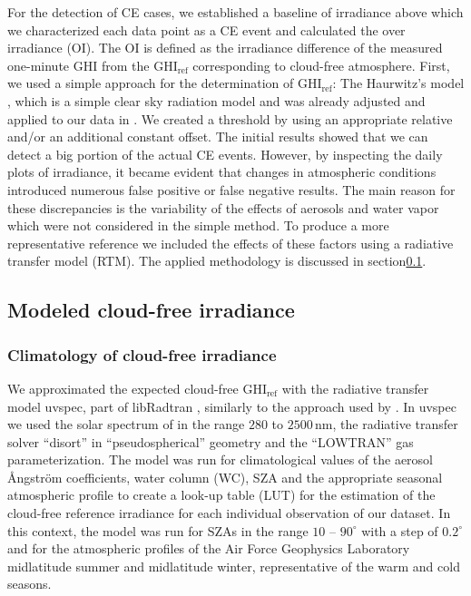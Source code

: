 \documentclass[preprint, 5p,
authoryear]{elsarticle} %
\begin{document}
For the detection of CE cases, we established a baseline of irradiance
above which we characterized each data point as a CE event and
calculated the over irradiance (OI). The OI is defined as the irradiance
difference of the measured one-minute GHI from the
\(\text{GHI}_\text{ref}\) corresponding to cloud-free atmosphere. First,
we used a simple approach for the determination of
\(\text{GHI}_\text{ref}\): The Haurwitz's model \citep{Haurwitz1945},
which is a simple clear sky radiation model and was already adjusted and
applied to our data in \citet{Natsis2023}. We created a threshold by
using an appropriate relative and/or an additional constant offset. The
initial results showed that we can detect a big portion of the actual CE
events. However, by inspecting the daily plots of irradiance, it became
evident that changes in atmospheric conditions introduced numerous false
positive or false negative results. The main reason for these
discrepancies is the variability of the effects of aerosols and water
vapor which were not considered in the simple method. To produce a more
representative reference we included the effects of these factors using
a radiative transfer model (RTM). The applied methodology is discussed
in section\nobreakspace{}\ref{rtmcs}.

\hypertarget{rtmcs}{%
\subsection{Modeled cloud-free irradiance}\label{rtmcs}}

\hypertarget{climatology-of-cloud-free-irradiance}{%
\subsubsection{Climatology of cloud-free
irradiance}\label{climatology-of-cloud-free-irradiance}}

We approximated the expected cloud-free \(\text{GHI}_\text{ref}\) with
the radiative transfer model uvspec, part of libRadtran
\citep{Emde2016}, similarly to the approach used by
\citet{Vamvakas2020}. In uvspec we used the solar spectrum of
\citet{Kurucz1994} in the range \(280\) to \(2500\,\text{nm}\), the
radiative transfer solver ``disort'' in ``pseudospherical'' geometry and
the ``LOWTRAN'' gas parameterization. The model was run for
climatological values of the aerosol Ångström coefficients, water column
(WC), SZA and the appropriate seasonal atmospheric profile to create a
look-up table (LUT) for the estimation of the cloud-free reference
irradiance for each individual observation of our dataset. In this
context, the model was run for SZAs in the range \(10\) -- \(90^\circ\)
with a step of \(0.2^\circ\) and for the atmospheric profiles of the Air
Force Geophysics Laboratory \citep{Anderson1986} midlatitude summer and
midlatitude winter, representative of the warm and cold seasons.
\end{document}
